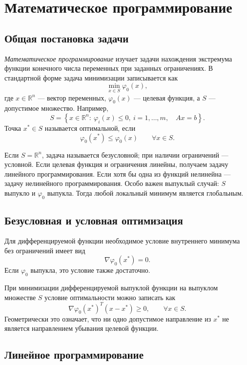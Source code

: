 \section{Математическое программирование}
\label{sec:mathematical-programming}

\subsection{Общая постановка задачи}

\emph{Математическое программирование} изучает задачи нахождения экстремума
функции конечного числа переменных при заданных ограничениях. В стандартной
форме задача минимизации записывается как
\[
    \min_{x\in S}\varphi_0(x),
\]
где $x\in\mathbb R^n$ --- вектор переменных, $\varphi_0(x)$ --- целевая функция,
а $S$ --- допустимое множество. Например,
\[
    S=\left\{x\in\mathbb R^n:\
    \varphi_i(x)\leq0,\ i=1,\ldots,m,\quad Ax=b\right\}.
\]
Точка $x^*\in S$ называется оптимальной, если
\[
    \varphi_0(x^*)\leq\varphi_0(x)
    \qquad\forall x\in S.
\]

Если $S=\mathbb R^n$, задача называется безусловной; при наличии ограничений ---
условной. Если целевая функция и ограничения линейны, получаем задачу линейного
программирования. Если хотя бы одна из функций нелинейна --- задачу нелинейного
программирования. Особо важен выпуклый случай: $S$ выпукло и $\varphi_0$
выпукла. Тогда любой локальный минимум является глобальным.

\subsection{Безусловная и условная оптимизация}

Для дифференцируемой функции необходимое условие внутреннего минимума без
ограничений имеет вид
\[
    \nabla\varphi_0(x^*)=0.
\]
Если $\varphi_0$ выпукла, это условие также достаточно.

При минимизации дифференцируемой выпуклой функции на выпуклом множестве $S$
условие оптимальности можно записать как
\[
    \nabla\varphi_0(x^*)^T(x-x^*)\geq0,
    \qquad \forall x\in S.
\]
Геометрически это означает, что ни одно допустимое направление из $x^*$ не
является направлением убывания целевой функции.

\subsection{Линейное программирование}

